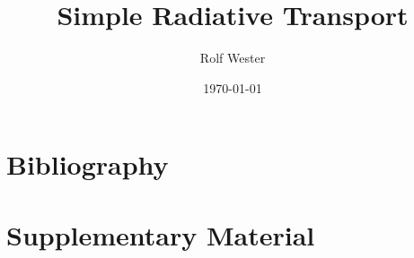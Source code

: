 \documentclass[fleqn]{scrartcl}
\title{Simple Radiative Transport}
\author{Rolf Wester}
\date{\today}
\begin{document}
\maketitle
\tableofcontents

\graphicspath{{figures/} }






\newpage
\section{Bibliography}
\printbibliography[heading=none]  

\newpage
\appendix


\newpage
\section{Supplementary Material}



\end{document}
